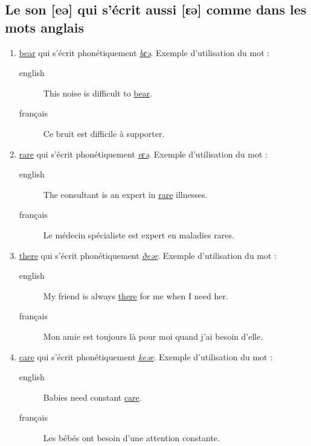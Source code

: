 \documentclass[12pt,a4paper]{book}
\begin{document}
\subsection{Le son [eə] qui s'écrit aussi [ɛə] comme dans les mots anglais}
\label{sec:org0206cfe}
\begin{enumerate}
\item \href{http://www.wordreference.com/enfr/bear}{bear} qui s'écrit phonétiquement \href{https://dictionary.cambridge.org/dictionary/english/bear}{\emph{bɛə}}. Exemple d'utilisation du mot :
\begin{description}
\item[{english}] \textenglish{This noise is difficult to \href{https://youtu.be/NJ6jv\_lPBN8}{bear}.}
\item[{français}] Ce bruit est difficile à supporter.
\end{description}
\item \href{http://www.wordreference.com/enfr/rare}{rare} qui s'écrit phonétiquement \href{https://dictionary.cambridge.org/dictionary/english/rare}{\emph{rɛə}}. Exemple d'utilisation du mot :
\begin{description}
\item[{english}] \textenglish{The consultant is an expert in \href{https://youtu.be/hPncU3924fU}{rare} illnesses.}
\item[{français}] Le médecin spécialiste est expert en maladies rares.
\end{description}
\item \href{http://www.wordreference.com/enfr/there}{there} qui s'écrit phonétiquement \href{https://dictionary.cambridge.org/dictionary/english/there}{\emph{ðeər}}. Exemple d'utilisation du mot :
\begin{description}
\item[{english}] \textenglish{My friend is always \href{https://youtu.be/fg9pkAYvrSM}{there} for me when I need her.}
\item[{français}] Mon amie est toujours là pour moi quand j'ai besoin
d'elle.
\end{description}
\item \href{http://www.wordreference.com/enfr/care}{care} qui s'écrit phonétiquement \href{https://dictionary.cambridge.org/dictionary/english/care}{\emph{keər}}. Exemple d'utilisation du mot :
\begin{description}
\item[{english}] \textenglish{Babies need constant \href{https://youtu.be/ClrSEz\_tBZw}{care}.}
\item[{français}] Les bébés ont besoin d'une attention constante.
\end{description}
\end{enumerate}
\end{document}
